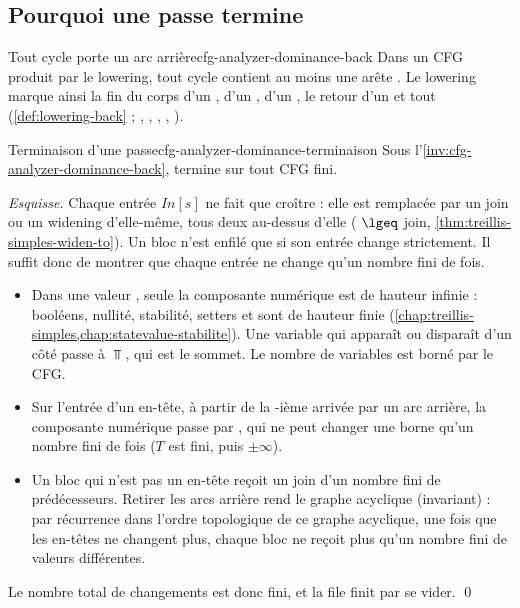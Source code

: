 \subsection{Pourquoi une passe termine}

\begin{invariant}{Tout cycle porte un arc arrière}{cfg-analyzer-dominance-back}
  Dans un CFG produit par le lowering, tout cycle contient au moins une arête
  . Le lowering marque ainsi la fin du corps d'un
  , d'un , d'un , le retour d'un
   et tout 
  (\cref{def:lowering-back} ; ,
  , ,
  , ).
\end{invariant}

\begin{theoreme}{Terminaison d'une passe}{cfg-analyzer-dominance-terminaison}
  Sous l'\cref{inv:cfg-analyzer-dominance-back},  termine
  sur tout CFG fini.
\end{theoreme}

\noindent\emph{Esquisse.} Chaque entrée $\mathit{In}[s]$ ne fait que croître :
elle est remplacée par un join ou un widening d'elle-même, tous deux
au-dessus d'elle ( $\lgeq$ join,
\cref{thm:treillis-simples-widen-to}). Un bloc n'est enfilé que si son entrée
change strictement. Il suffit donc de montrer que chaque entrée ne change
qu'un nombre fini de fois.
\begin{itemize}
  \item Dans une valeur , seule la composante numérique est
    de hauteur infinie : booléens, nullité, stabilité, setters et
     sont de hauteur finie
    (\cref{chap:treillis-simples,chap:statevalue-stabilite}). Une variable
    qui apparaît ou disparaît d'un côté passe à $\Top$, qui est le sommet.
    Le nombre de variables est borné par le CFG.
  \item Sur l'entrée d'un en-tête, à partir de la
    -ième arrivée par un arc arrière, la composante
    numérique passe par , qui ne peut changer une borne
    qu'un nombre fini de fois ($T$ est fini, puis $\pm\infty$).
  \item Un bloc qui n'est pas un en-tête reçoit un join d'un nombre fini de
    prédécesseurs. Retirer les arcs arrière rend le graphe acyclique
    (invariant) : par récurrence dans l'ordre topologique de ce graphe
    acyclique, une fois que les en-têtes ne changent plus, chaque bloc ne
    reçoit plus qu'un nombre fini de valeurs différentes.
\end{itemize}
Le nombre total de changements est donc fini, et la file finit par se vider.
\qed


